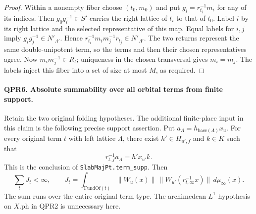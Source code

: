 \begin{proof}
Within a nonempty fiber choose \((t_0,m_0)\) and put
\(g_i=r_{t_i}^{-1}m_i\) for any of its indices. Then
\(g_0g_i^{-1}\in S'\) carries the right lattice of \(t_i\) to that
of \(t_0\). Label \(i\) by its right lattice and the selected
representative of this map. Equal labels for \(i,j\) imply
\(g_i g_j^{-1}\in N'_{\Lambda'}\). Hence
\(r_{t_i}^{-1}m_i m_j^{-1}r_{t_j}\in N'_{\Lambda'}\).
The two returns represent the same double-unipotent term, so the
terms and then their chosen representatives agree. Now
\(m_i m_j^{-1}\in R_t\); uniqueness in the chosen transversal
gives \(m_i=m_j\). The labels inject this fiber into a set of size
at most \(M\), as required.
\end{proof}

\paragraph{QPR6. Absolute summability over all orbital terms from finite support.}
Retain the two original folding hypotheses. The additional finite-place
input in this claim is the following precise support assertion. Put
\(a_\Lambda=h_{\mathrm{base}(\Lambda)}x_u\). For every original
term \(t\) with left lattice \(\Lambda\), there exist
\(h'\in H_{u',f}\) and \(k\in K\) such that
\[
           r_{t,f}^{-1}a_\Lambda=h'x_{u'}k.                 \tag{QPR.1}
\]
This is the conclusion of \texttt{SlabMajPt.term\_supp}. Then
\[
  \sum_t J_t<\infty,\qquad
  J_t=\int_{\mathrm{FundOf}(t)}
  \|W_u(x)\|\,\|W_{u'}(r_{t,\infty}^{-1}x)\|\,d\mu_\infty(x).
\]
The sum runs over the entire original term type. The archimedean
\(L^1\) hypothesis on \(X.\mathrm{ph}\) in QPR2 is unnecessary here.
